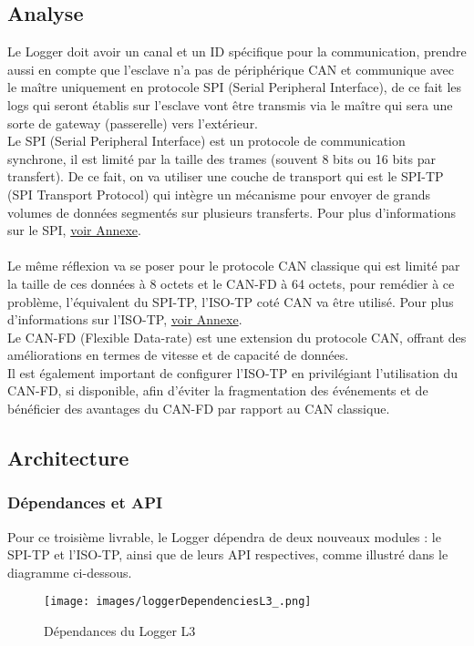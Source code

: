 \documentclass[a4paper, 12pt]{report}
\begin{document}
\subsection{Analyse} \label{subsec:analyseL3}
Le Logger doit avoir un canal et un ID spécifique pour la communication, prendre aussi en compte que l'esclave n'a pas de périphérique CAN et communique avec le maître uniquement en protocole SPI (Serial Peripheral Interface), de ce fait les logs qui seront établis sur l'esclave vont être transmis via le maître  qui sera une sorte de gateway (passerelle) vers l'extérieur.\\

Le SPI (Serial Peripheral Interface) est un protocole de communication synchrone, il est limité par la taille des trames (souvent 8 bits ou 16 bits par transfert). De ce fait, on va utiliser une couche de transport qui est le SPI-TP (SPI Transport Protocol) qui intègre un mécanisme pour envoyer de grands volumes de données segmentés sur plusieurs transferts. Pour plus d'informations sur le SPI, \hyperref[subsec:spiTP]{voir Annexe}.\\
\\
Le même réflexion va se poser pour le protocole CAN classique qui est limité par la taille de ces données à 8 octets et le CAN-FD à 64 octets, pour remédier à ce problème, l'équivalent du SPI-TP, l'\gls{ISO-TP} coté CAN va être utilisé. Pour plus d'informations sur l'ISO-TP, \hyperref[subsec:isoTP]{voir Annexe}.
\\

Le CAN-FD (Flexible Data-rate) est une extension du protocole CAN, offrant des améliorations en termes de vitesse et de capacité de données.\\


Il est également important de configurer l'ISO-TP en privilégiant l'utilisation du CAN-FD, si disponible, afin d'éviter la fragmentation des événements et de bénéficier des avantages du CAN-FD par rapport au CAN classique.


\subsection{Architecture}
\subsubsection{Dépendances et API}
Pour ce troisième livrable, le Logger dépendra de deux nouveaux modules : le SPI-TP et l'ISO-TP, ainsi que de leurs API respectives, comme illustré dans le diagramme ci-dessous.
\begin{figure}[H]
           \centering
           \texttt{[image: images/loggerDependenciesL3\_.png]}
           \caption{Dépendances du Logger L3}
           \label{fig:depdenL3}
       \end{figure}
\end{document}
